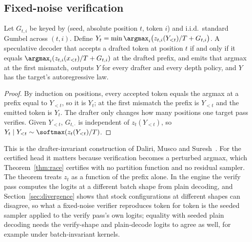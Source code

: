 \subsection{Fixed-noise verification}\label{sec:fixednoise}
\begin{theorem}\label{thm:fixednoise}
Let $G_{t,i}$ be keyed by (seed, absolute position $t$, token $i$) and i.i.d.\ standard Gumbel across $(t,i)$. Define $Y_t=\min\argmax_i\bigl(z_{t,i}(Y_{<t})/T+G_{t,i}\bigr)$. A speculative decoder that accepts a drafted token at position $t$ if and only if it equals $\argmax_i(z_{t,i}(x_{<t})/T+G_{t,i})$ at the drafted prefix, and emits that argmax at the first mismatch, outputs $Y$ for every drafter and every depth policy, and $Y$ has the target's autoregressive law.
\end{theorem}
\begin{proof}
By induction on positions, every accepted token equals the argmax at a prefix equal to $Y_{<t}$, so it is $Y_t$; at the first mismatch the prefix is $Y_{<t}$ and the emitted token is $Y_t$. The drafter only changes how many positions one target pass verifies. Given $Y_{<t}$, $G_{t,\cdot}$ is independent of $z_t(Y_{<t})$, so $Y_t\mid Y_{<t}\sim\softmax(z_t(Y_{<t})/T)$.
\end{proof}
This is the drafter-invariant construction of Daliri, Musco and Suresh~\cite{daliri2025}. For the certified head it matters because verification becomes a perturbed argmax, which Theorem~\ref{thm:race} certifies with no partition function and no residual sampler. The theorem treats $z_t$ as a function of the prefix alone. In the engine the verify pass computes the logits at a different batch shape from plain decoding, and Section~\ref{sec:divergence} shows that stock configurations at different shapes can disagree, so what a fixed-noise verifier reproduces token for token is the seeded sampler applied to the verify pass's own logits; equality with seeded plain decoding needs the verify-shape and plain-decode logits to agree as well, for example under batch-invariant kernels.

